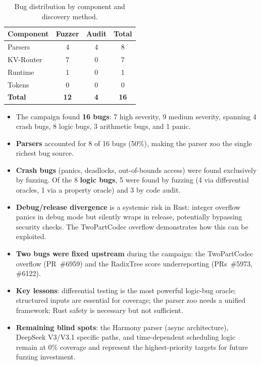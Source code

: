 \begin{table}[ht]
\centering
\begin{tabular}{lccc}
\toprule
\textbf{Component} & \textbf{Fuzzer} & \textbf{Audit} & \textbf{Total} \\
\midrule
Parsers    & 4 & 4 & 8 \\
KV-Router  & 7 & 0 & 7 \\
Runtime    & 1 & 0 & 1 \\
Tokens     & 0 & 0 & 0 \\
\midrule
\textbf{Total} & \textbf{12} & \textbf{4} & \textbf{16} \\
\bottomrule
\end{tabular}
\caption{Bug distribution by component and discovery method.}
\label{tab:bug-summary}
\end{table}

\begin{itemize}
  \item The campaign found \textbf{16 bugs}: 7 high severity, 9 medium severity, spanning 4 crash bugs, 8 logic bugs, 3 arithmetic bugs, and 1 panic.
  \item \textbf{Parsers} accounted for 8 of 16 bugs (50\%), making the parser zoo the single richest bug source.
  \item \textbf{Crash bugs} (panics, deadlocks, out-of-bounds access) were found exclusively by fuzzing. Of the 8 \textbf{logic bugs}, 5 were found by fuzzing (4 via differential oracles, 1 via a property oracle) and 3 by code audit.
  \item \textbf{Debug/release divergence} is a systemic risk in Rust: integer overflow panics in debug mode but silently wraps in release, potentially bypassing security checks. The TwoPartCodec overflow demonstrates how this can be exploited.
  \item \textbf{Two bugs were fixed upstream} during the campaign: the TwoPartCodec overflow (PR~\#6959) and the RadixTree score underreporting (PRs~\#5973, \#6122).
  \item \textbf{Key lessons}: differential testing is the most powerful logic-bug oracle; structured inputs are essential for coverage; the parser zoo needs a unified framework; Rust safety is necessary but not sufficient.
  \item \textbf{Remaining blind spots}: the Harmony parser (async architecture), DeepSeek V3/V3.1 specific paths, and time-dependent scheduling logic remain at 0\% coverage and represent the highest-priority targets for future fuzzing investment.
\end{itemize}

